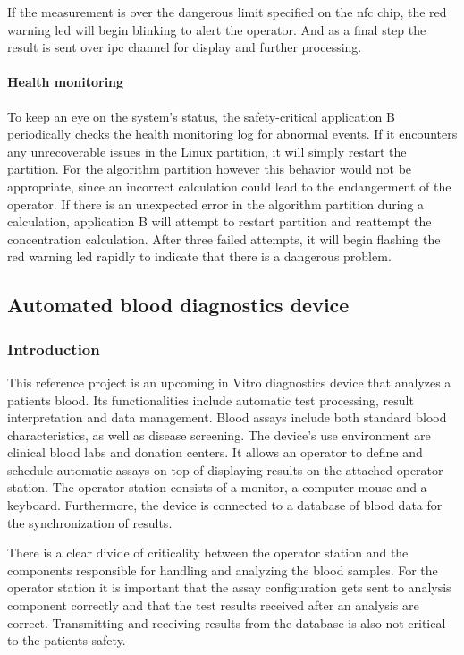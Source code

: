 If the measurement is over the dangerous limit specified on the \acrshort{nfc} chip, the red warning \acrshort{led} will begin blinking to alert the operator. And as a final step the result is sent over \acrshort{ipc} channel \bToa for display and further processing.

\paragraph{Health monitoring}
To keep an eye on the system's status, the safety-critical application B periodically checks the health monitoring log for abnormal events. If it encounters any unrecoverable issues in the Linux partition, it will simply restart the partition. 
For the algorithm partition however this behavior would not be appropriate, since an incorrect calculation could lead to the endangerment of the operator. If there is an unexpected error in the algorithm partition during a calculation, application B will attempt to restart partition and reattempt the concentration calculation. After three failed attempts, it will begin flashing the red warning \acrshort{led} rapidly to indicate that there is a dangerous problem.

\subsection{Automated blood diagnostics device}
\subsubsection{Introduction}
This reference project is an upcoming in Vitro diagnostics device that analyzes a patients blood. Its functionalities include automatic test processing, result interpretation and data management. Blood assays include both standard blood characteristics, as well as disease screening.
The device's use environment are clinical blood labs and donation centers. It allows an operator to define and schedule automatic assays on top of displaying results on the attached operator station. The operator station consists of a monitor, a computer-mouse and a keyboard. Furthermore, the device is connected to a database of blood data for the synchronization of results.

There is a clear divide of criticality between the operator station and the components responsible for handling and analyzing the blood samples. For the operator station it is important that the assay configuration gets sent to analysis component correctly and that the test results received after an analysis are correct. Transmitting and receiving results from the database is also not critical to the patients safety.


